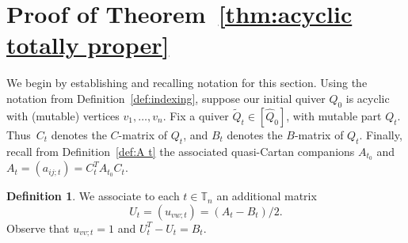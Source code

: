 \documentclass[11pt, letterpaper]{amsart}
\theoremstyle{definition}
\newtheorem{definition}[theorem]{Definition}
\numberwithin{equation}{section}
\newcommand{\Qinit}{Q_0}
\newcommand{\Qtmut}{Q_t}
\begin{document}
\newpage

\section{{Proof of Theorem~\ref{thm:acyclic totally proper}}}
\label{sec:thm}


We begin by establishing and recalling notation for this section. 
Using the notation from Definition~\ref{def:indexing}, suppose our initial quiver $\Qinit$ is acyclic with (mutable) vertices $v_1, \ldots, v_n$. 
Fix a quiver $\tilde Q_t \in [ \widehat \Qinit ]$, with mutable part $\Qtmut$. 
Thus~$C_t$ denotes the $C$-matrix of $\Qtmut$, and $B_t$ denotes the $B$-matrix of $\Qtmut$.
Finally, recall from Definition~\ref{def:A t} the associated quasi-Cartan companions $A_{t_0}$ and $A_t = (a_{ij;t}) = C_t^T A_{t_0} C_t$.

\begin{definition}
\label{def:U t}
We associate to each $t \in \mathbb{T}_n$ an additional matrix 
$$U_t = (u_{vw;t}) = (A_t - B_t)/2.$$ 
Observe that $u_{vv;t}=1$ and $U_t^T - U_t = B_t$.
\end{definition}
\end{document}
